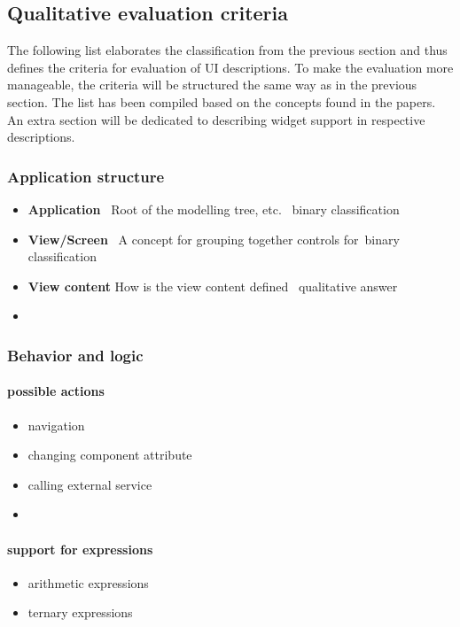 \subsection{Qualitative evaluation criteria}\label{subsec:evaluation-criteria}

The following list elaborates the classification from the previous section and thus defines the criteria for evaluation of UI descriptions.
To make the evaluation more manageable, the criteria will be structured the same way as in the previous section.
The list has been compiled based on the concepts found in the papers.
An extra section will be dedicated to describing widget support in respective descriptions.


\subsubsection{Application structure}
\begin{itemize}
    \item \textbf{Application} \textendash\ Root of the modelling tree, etc. \textendash\ binary classification
    \item \textbf{View/Screen} \textendash\ A concept for grouping together controls for\textellipsis \textendash\ binary classification
    \item \textbf{View content} How is the view content defined \textendash\ qualitative answer
    \item \textellipsis
\end{itemize}

\subsubsection{Behavior and logic}
\paragraph{possible actions}
\begin{itemize}
    \item navigation
    \item changing component attribute
    \item calling external service
    \item \textellipsis
\end{itemize}

\paragraph{support for expressions}
\begin{itemize}
    \item arithmetic expressions
    \item ternary expressions
\end{itemize}

